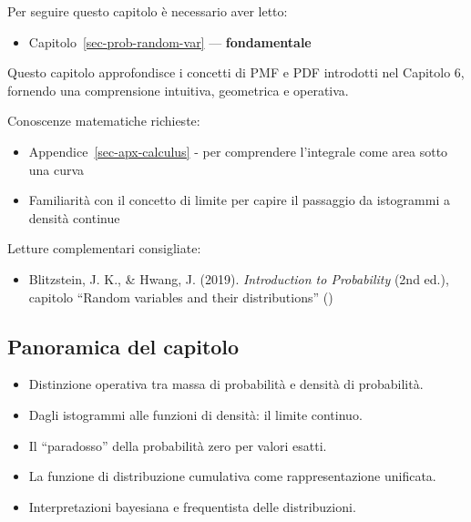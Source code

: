 \documentclass[
  italian,
  letterpaper,
  a4paper,
  11pt,
  open=any]{scrbook}
\providecommand{\tightlist}{%
  \setlength{\itemsep}{0pt}\setlength{\parskip}{0pt}}
\theoremstyle{plain}
\theoremstyle{definition}
\theoremstyle{definition}
\theoremstyle{remark}
\begin{document}
\begin{tcolorbox}[enhanced jigsaw, arc=.35mm, bottomrule=.15mm, bottomtitle=1mm, breakable, colback=white, colbacktitle=quarto-callout-tip-color!10!white, colframe=quarto-callout-tip-color-frame, coltitle=black, left=2mm, leftrule=.75mm, opacityback=0, opacitybacktitle=0.6, rightrule=.15mm, title=\textcolor{quarto-callout-tip-color}{\faLightbulb}\hspace{0.5em}{Prerequisiti}, titlerule=0mm, toprule=.15mm, toptitle=1mm]

Per seguire questo capitolo è necessario aver letto:

\begin{itemize}
\tightlist
\item
  Capitolo~\ref{sec-prob-random-var} --- \textbf{fondamentale}
\end{itemize}

Questo capitolo approfondisce i concetti di PMF e PDF introdotti nel
Capitolo 6, fornendo una comprensione intuitiva, geometrica e operativa.

Conoscenze matematiche richieste:

\begin{itemize}
\tightlist
\item
  Appendice~\ref{sec-apx-calculus} - per comprendere l'integrale come
  area sotto una curva
\item
  Familiarità con il concetto di limite per capire il passaggio da
  istogrammi a densità continue
\end{itemize}

Letture complementari consigliate:

\begin{itemize}
\tightlist
\item
  Blitzstein, J. K., \& Hwang, J. (2019). \emph{Introduction to
  Probability} (2nd ed.), capitolo ``Random variables and their
  distributions'' ()
\end{itemize}

\end{tcolorbox}

\subsection*{Panoramica del capitolo}\label{panoramica-del-capitolo-2}

\begin{itemize}
\tightlist
\item
  Distinzione operativa tra massa di probabilità e densità di
  probabilità.
\item
  Dagli istogrammi alle funzioni di densità: il limite continuo.
\item
  Il ``paradosso'' della probabilità zero per valori esatti.
\item
  La funzione di distribuzione cumulativa come rappresentazione
  unificata.
\item
  Interpretazioni bayesiana e frequentista delle distribuzioni.
\end{itemize}
\end{document}
